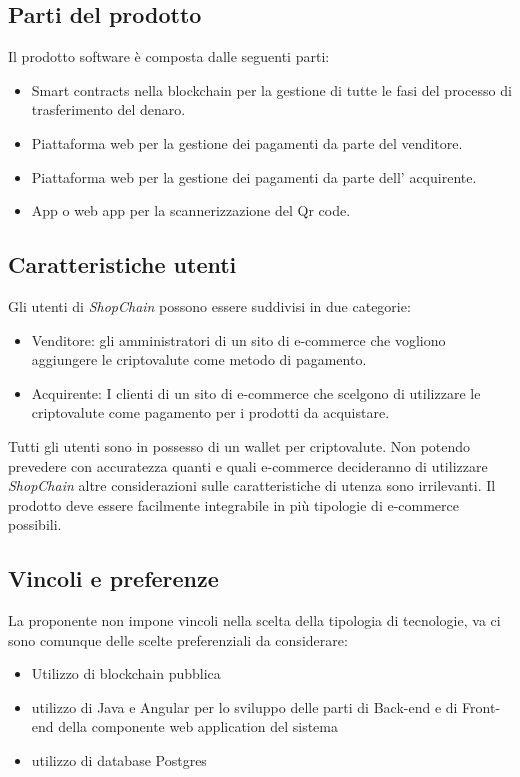 \documentclass[a4paper, 12pt]{article}
\begin{document}
\subsection{Parti del prodotto}
Il prodotto software è composta dalle seguenti parti:
\begin{itemize}
\item Smart contracts nella blockchain per la gestione di tutte le fasi del processo di trasferimento del denaro.
\item Piattaforma web per la gestione dei pagamenti da parte del venditore.
\item Piattaforma web per la gestione dei pagamenti da parte dell' acquirente.
\item App o web app per la scannerizzazione del Qr code.
\end{itemize}
\subsection{Caratteristiche utenti}
Gli utenti di \textit{ShopChain} possono essere suddivisi in due categorie:
\begin{itemize}
\item Venditore: gli amministratori di un sito di e-commerce che vogliono aggiungere le criptovalute come metodo di pagamento.
\item Acquirente: I clienti di un sito di e-commerce che scelgono di utilizzare le criptovalute come pagamento per i prodotti da acquistare.
\end{itemize}
Tutti gli utenti sono in possesso di un wallet per criptovalute. 
Non potendo prevedere con accuratezza quanti e quali e-commerce decideranno di utilizzare \textit{ShopChain} altre considerazioni sulle caratteristiche di utenza sono irrilevanti. Il prodotto deve essere facilmente integrabile in più tipologie di e-commerce possibili.

\subsection{Vincoli e preferenze}
La proponente non impone vincoli nella scelta della tipologia di tecnologie, va ci sono comunque delle scelte preferenziali da considerare:
\begin{itemize}
\item Utilizzo di blockchain pubblica
\item utilizzo di Java e Angular per lo sviluppo delle parti di Back-end e di Front-end della componente web application del sistema
\item utilizzo di database Postgres
\end{itemize}
\end{document}
